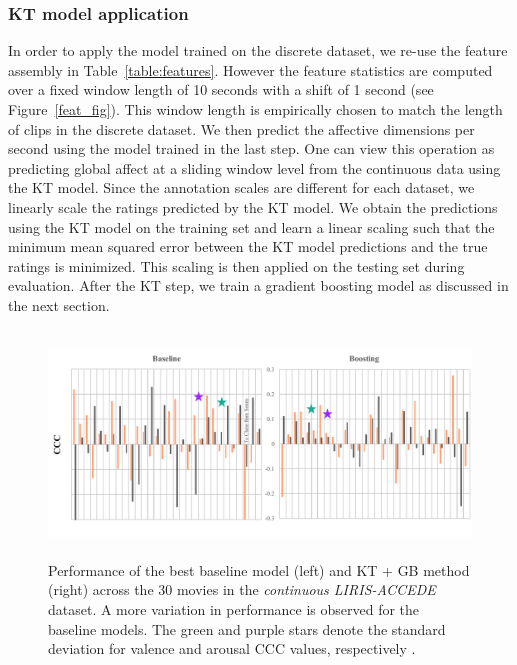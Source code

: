 \documentclass{article}
\begin{document}
\begin{spacing}{0.9}
\vspace{-2mm}
\subsubsection{KT model application}
\vspace{-2mm}
In order to apply the model trained on the discrete dataset, we re-use the feature assembly in Table~\ref{table:features}.
However the feature statistics are computed over a fixed window length of 10 seconds with a shift of 1 second (see Figure~\ref{feat_fig}). 
This window length is empirically chosen to match the length of clips in the discrete dataset. 
We then predict the affective dimensions per second using the model trained in the last step.
One can view this operation as predicting global affect at a sliding window level from the continuous data using the KT model.
Since the annotation scales are different for each dataset, we linearly scale the ratings predicted by the KT model.
We obtain the predictions using the KT model on the training set and learn a linear scaling such that the minimum mean squared error between the KT model predictions and the true ratings is minimized.
This scaling is then applied on the testing set during evaluation. 
After the KT step, we train a gradient boosting model as discussed in the next section. 


\begin{figure}[t]
\vspace{-5mm}
\includegraphics[width=\textwidth, height = 6cm]{images/comparison.pdf}
\centering
\vspace{-11mm}
\caption{Performance of the best baseline model (left) and KT + GB method (right) across the 30 movies in the {\it continuous LIRIS-ACCEDE} dataset. A more variation in performance is observed for the baseline models. The green and purple stars denote the standard deviation for valence and arousal CCC values, respectively .}
\vspace{-5mm}
\label{comparison}
\end{figure}
\vspace{-2mm}

\end{spacing}
\end{document}
